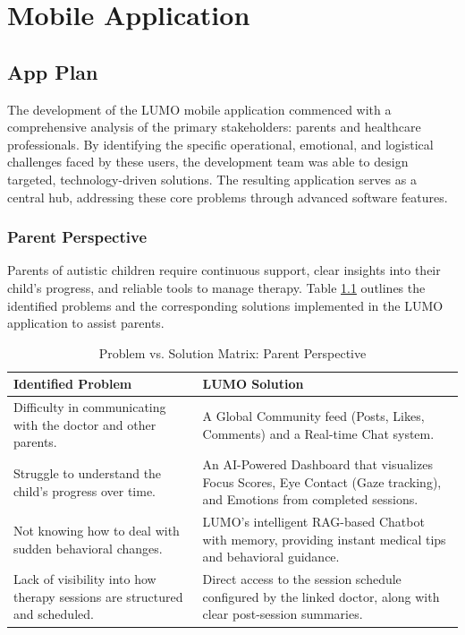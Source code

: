 \documentclass[12pt,a4paper]{report}
\begin{document}
\tableofcontents
\setcounter{chapter}{5}
\chapter{Mobile Application}

\section{App Plan}

The development of the LUMO mobile application commenced with a comprehensive analysis of the primary stakeholders: parents and healthcare professionals. By identifying the specific operational, emotional, and logistical challenges faced by these users, the development team was able to design targeted, technology-driven solutions. The resulting application serves as a central hub, addressing these core problems through advanced software features.

\subsection{Parent Perspective}

Parents of autistic children require continuous support, clear insights into their child's progress, and reliable tools to manage therapy. Table \ref{tab:parent_perspective} outlines the identified problems and the corresponding solutions implemented in the LUMO application to assist parents.

\begin{table}[H]
    \centering
    \renewcommand{\arraystretch}{1.5}
    \caption{Problem vs. Solution Matrix: Parent Perspective}
    \label{tab:parent_perspective}
    \begin{tabular}{|p{}|p{}|}
        \hline
        \textbf{Identified Problem} & \textbf{LUMO Solution} \\
        \hline
        Difficulty in communicating with the doctor and other parents. & A Global Community feed (Posts, Likes, Comments) and a Real-time Chat system. \\
        \hline
        Struggle to understand the child's progress over time. & An AI-Powered Dashboard that visualizes Focus Scores, Eye Contact (Gaze tracking), and Emotions from completed sessions. \\
        \hline
        Not knowing how to deal with sudden behavioral changes. & LUMO's intelligent RAG-based Chatbot with memory, providing instant medical tips and behavioral guidance. \\
        \hline
        Lack of visibility into how therapy sessions are structured and scheduled. & Direct access to the session schedule configured by the linked doctor, along with clear post-session summaries. \\
        \hline
    \end{tabular}
\end{table}
\end{document}
